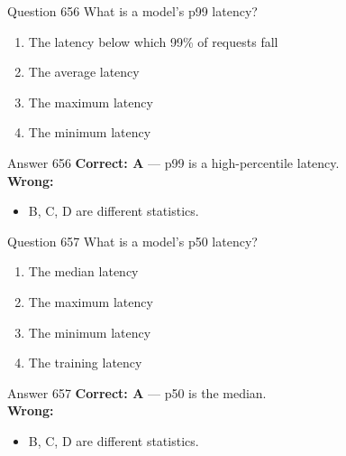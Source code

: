 \documentclass[aspectratio=169,11pt]{beamer}
\begin{document}
	\begin{frame}{Question 656}
		What is a model's p99 latency?
		\begin{enumerate}[label=\Alph*.]
			\item The latency below which 99\% of requests fall
			\item The average latency
			\item The maximum latency
			\item The minimum latency
		\end{enumerate}
	\end{frame}
	\begin{frame}{Answer 656}
		\textbf{Correct: A} --- p99 is a high-percentile latency.\\
		\vspace{0.5em}
		\textbf{Wrong:}
		\begin{itemize}
			\item B, C, D are different statistics.
		\end{itemize}
	\end{frame}
	
	\begin{frame}{Question 657}
		What is a model's p50 latency?
		\begin{enumerate}[label=\Alph*.]
			\item The median latency
			\item The maximum latency
			\item The minimum latency
			\item The training latency
		\end{enumerate}
	\end{frame}
	\begin{frame}{Answer 657}
		\textbf{Correct: A} --- p50 is the median.\\
		\vspace{0.5em}
		\textbf{Wrong:}
		\begin{itemize}
			\item B, C, D are different statistics.
		\end{itemize}
	\end{frame}
	
\end{document}
